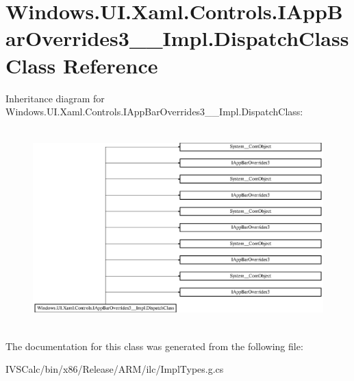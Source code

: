 \hypertarget{class_windows_1_1_u_i_1_1_xaml_1_1_controls_1_1_i_app_bar_overrides3_____impl_1_1_dispatch_class}{}\section{Windows.\+U\+I.\+Xaml.\+Controls.\+I\+App\+Bar\+Overrides3\+\_\+\+\_\+\+Impl.\+Dispatch\+Class Class Reference}
\label{class_windows_1_1_u_i_1_1_xaml_1_1_controls_1_1_i_app_bar_overrides3_____impl_1_1_dispatch_class}
Inheritance diagram for Windows.\+U\+I.\+Xaml.\+Controls.\+I\+App\+Bar\+Overrides3\+\_\+\+\_\+\+Impl.\+Dispatch\+Class\+:\begin{figure}[H]
\begin{center}
\leavevmode
\includegraphics[height=7.661692cm]{class_windows_1_1_u_i_1_1_xaml_1_1_controls_1_1_i_app_bar_overrides3_____impl_1_1_dispatch_class}
\end{center}
\end{figure}


The documentation for this class was generated from the following file\+:\begin{DoxyCompactItemize}
\item 
I\+V\+S\+Calc/bin/x86/\+Release/\+A\+R\+M/ilc/Impl\+Types.\+g.\+cs\end{DoxyCompactItemize}
